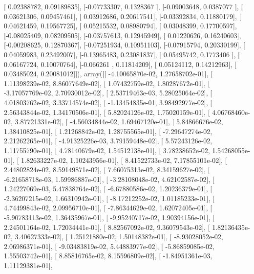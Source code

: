 \documentclass{article}
\begin{document}
       [ 0.02388782,  0.09189835],
       [-0.07733307,  0.1328367 ],
       [-0.09003648,  0.0387077 ],
       [ 0.03621306,  0.09457461],
       [ 0.03912686,  0.20617541],
       [-0.03392834,  0.11880179],
       [ 0.04621459,  0.19567725],
       [ 0.05215532,  0.08980794],
       [ 0.03048399,  0.17700597],
       [-0.08025409,  0.08209505],
       [-0.03757613,  0.12945949],
       [ 0.01220626,  0.16240603],
       [-0.00208625,  0.12870367],
       [-0.07251934,  0.10951103],
       [-0.07915794,  0.20330199],
       [ 0.04059983,  0.23492007],
       [-0.13965483,  0.23081837],
       [ 0.05495742,  0.1773406 ],
       [ 0.06167724,  0.10070764],
       [-0.066261  ,  0.11814209],
       [ 0.05124112,  0.14212963],
       [ 0.03485024,  0.20081012]]), array([[ -4.10065870e-02,   1.27658702e-01],
       [  1.11398239e-02,   8.86077649e-02],
       [  1.07432759e-02,   1.80287672e-01],
       [ -3.17057769e-02,   2.70930012e-02],
       [  2.53719463e-03,   5.28025064e-02],
       [  4.01803762e-02,   3.33714574e-02],
       [ -1.13454835e-01,   3.98492977e-02],
       [  2.56343844e-02,   1.34170506e-01],
       [  5.82024126e-02,   1.75020159e-01],
       [  4.06768460e-02,   3.87721331e-02],
       [ -4.56034844e-02,   1.69467120e-01],
       [  5.84866676e-02,   1.38410825e-01],
       [  1.21268842e-02,   1.28755565e-01],
       [ -7.29647274e-02,   2.21262265e-01],
       [ -4.91325226e-03,   3.79159448e-02],
       [  5.57243126e-02,   1.11755790e-01],
       [  4.78140679e-02,   1.54512138e-01],
       [  3.78238652e-02,   1.54268055e-01],
       [  1.82633227e-02,   1.10243956e-01],
       [  8.41522733e-02,   7.17855101e-02],
       [  2.44802824e-02,   8.59149871e-02],
       [  7.66075313e-02,   8.34159627e-02],
       [ -6.21658718e-03,   1.59986887e-01],
       [ -3.28108048e-02,   4.62102587e-02],
       [  1.24227069e-03,   5.47838764e-02],
       [ -6.67880586e-02,   1.20236379e-01],
       [ -2.36207215e-02,   1.66310942e-01],
       [ -8.17212252e-02,   1.01185233e-01],
       [  4.74499843e-02,   2.09956710e-01],
       [ -7.86344629e-02,   1.62072405e-01],
       [ -5.90783113e-02,   1.36435967e-01],
       [ -9.95240717e-02,   1.90394156e-01],
       [  2.24501164e-02,   1.72034441e-01],
       [  8.82567092e-02,   9.36079543e-02],
       [  1.82136435e-02,   3.40627333e-02],
       [  1.25121880e-02,   1.50148382e-01],
       [ -8.93028052e-02,   2.06986371e-01],
       [ -9.03483819e-02,   5.44883977e-02],
       [ -5.86859085e-02,   1.55503742e-01],
       [  8.85816765e-02,   8.15596809e-02],
       [ -1.84951361e-03,   1.11129381e-01],
\end{document}
